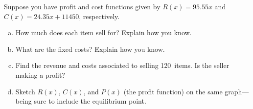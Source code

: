 \documentclass[11pt,letterpaper]{article}
\begin{document}
\newpage



 Suppose you have profit and cost functions given by $R(x)= 95.55x$ and $C(x)= 24.35x + 11450$, respectively. 
	\begin{enumerate}[(a)]
	\item How much does each item sell for? Explain how you know.
	\item What are the fixed costs? Explain how you know.
	\item Find the revenue and costs associated to selling 120~items. Is the seller making a profit?
	\item Sketch $R(x)$, $C(x)$, and $P(x)$ (the profit function) on the same graph---being sure to include the equilibrium point. 
	\end{enumerate} \pspace
\end{document}
